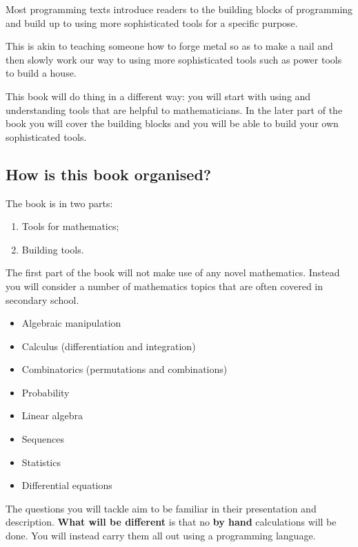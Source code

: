 
Most programming texts introduce readers to the building blocks of
programming and build up to using more sophisticated tools for a specific
purpose.

This is akin to teaching someone how to forge metal so as to make a nail and
then slowly work our way to using more sophisticated tools such as power tools
to build a house.

This book will do thing in a different way: you will start with using and
understanding tools that are helpful to mathematicians. In the later part of the
book you will cover the building blocks and you will be able to build your own
sophisticated tools.

\subsection{How is this book organised?}

The book is in two parts:

\begin{enumerate}
\item Tools for mathematics;
\item Building tools.
\end{enumerate}

The first part of the book will not make use of any novel mathematics.
Instead you will consider a number of mathematics topics that are often covered
in secondary school.

\begin{itemize}
    \item Algebraic manipulation
    \item Calculus (differentiation and integration)
    \item Combinatorics (permutations and combinations)
    \item Probability
    \item Linear algebra
    \item Sequences
    \item Statistics
    \item Differential equations
\end{itemize}

The questions you will tackle aim to be familiar in their presentation and
description. \textbf{What will be different} is that no \textbf{by hand} calculations will
be done. You will instead carry them all out using a programming language.

